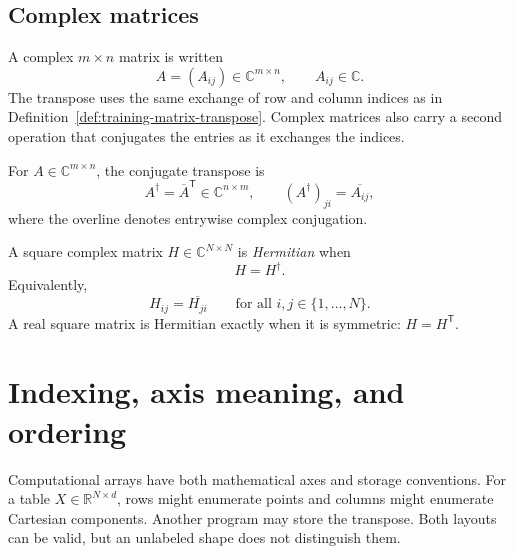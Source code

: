 \subsection{Complex matrices}

A complex \(m\times n\) matrix is written
\begin{equation}
  A=(A_{ij})\in\mathbb C^{m\times n},
  \qquad
  A_{ij}\in\mathbb C.
  \label{eq:training-basic-complex-matrix-notation}
\end{equation}
The transpose uses the same exchange of row and column indices as in
Definition~\ref{def:training-matrix-transpose}. Complex matrices also carry a
second operation that conjugates the entries as it exchanges the indices.

\begin{definition}
\label{def:training-matrix-conjugate-transpose}
For \(A\in\mathbb C^{m\times n}\), the conjugate transpose is
\begin{equation}
  A^{\dagger}=\overline A^{\mathsf T}\in\mathbb C^{n\times m},
  \qquad
  \left(A^{\dagger}\right)_{ji}=\overline{A_{ij}},
  \label{eq:training-matrix-conjugate-transpose-definition}
\end{equation}
where the overline denotes entrywise complex conjugation.
\end{definition}

\begin{definition}
\label{def:training-hermitian-matrix}
A square complex matrix \(H\in\mathbb C^{N\times N}\) is \emph{Hermitian} when
\begin{equation}
  H=H^{\dagger}.
  \label{eq:training-hermitian-definition}
\end{equation}
Equivalently,
\begin{equation}
  H_{ij}=\overline{H_{ji}}
  \qquad
  \text{for all }i,j\in\{1,\ldots,N\}.
\end{equation}
A real square matrix is Hermitian exactly when it is symmetric:
\(H=H^{\mathsf T}\).
\end{definition}

\section{Indexing, axis meaning, and ordering}

Computational arrays have both mathematical axes and storage conventions. For a
table \(X\in\mathbb R^{N\times d}\), rows might enumerate points and columns
might enumerate Cartesian components. Another program may store the transpose.
Both layouts can be valid, but an unlabeled shape does not distinguish them.

